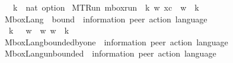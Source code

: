 \begin{isabellebody}
\ \ \ k\ {\isacharcolon}{\kern0pt}{\isacharcolon}{\kern0pt}\ {\isachardoublequoteopen}nat\ option{\isachardoublequoteclose}\ \isanewline
MTRun{\isacharcolon}{\kern0pt}\ {\isachardoublequoteopen}mbox{\isacharunderscore}{\kern0pt}run\ {\isasymC}\isactrlsub {\isasymI}\isactrlsub {\isasymmm}\ k\ w\ xc\ {\isasymLongrightarrow}\ w\ {\isasymin}\ {\isasymT}\isactrlbsub k\isactrlesub {\isachardoublequoteclose}\isanewline
\isanewline
{}\isamarkupfalse%
\ MboxLang\ {\isacharcolon}{\kern0pt}{\isacharcolon}{\kern0pt}\ {\isachardoublequoteopen}bound\ {\isasymRightarrow}\ {\isacharparenleft}{\kern0pt}{\isacharprime}{\kern0pt}information{\isacharcomma}{\kern0pt}\ {\isacharprime}{\kern0pt}peer{\isacharparenright}{\kern0pt}\ action\ language{\isachardoublequoteclose}\ \ {\isacharparenleft}{\kern0pt}{\isachardoublequoteopen}{\isasymL}\isactrlbsub {\isacharunderscore}{\kern0pt}\isactrlesub {\isachardoublequoteclose}\ {\isacharbrackleft}{\kern0pt}{}{}{}{\isacharbrackright}{\kern0pt}\ {}{}{}{\isacharparenright}{\kern0pt}\isanewline
\ \ \isanewline
\ \ {\isachardoublequoteopen}{\isasymL}\isactrlbsub k\isactrlesub \ {\isasymequiv}\ {\isacharbraceleft}{\kern0pt}\ w{\isasymdown}\isactrlsub {\isacharbang}{\kern0pt}\ {\isacharbar}{\kern0pt}\ w{\isachardot}{\kern0pt}\ w\ {\isasymin}\ {\isasymT}\isactrlbsub k\isactrlesub \ {\isacharbraceright}{\kern0pt}{\isachardoublequoteclose}\isanewline
\isanewline
{}\isamarkupfalse%
\ MboxLang{\isacharunderscore}{\kern0pt}bounded{\isacharunderscore}{\kern0pt}by{\isacharunderscore}{\kern0pt}one\ {\isacharcolon}{\kern0pt}{\isacharcolon}{\kern0pt}\ {\isachardoublequoteopen}{\isacharparenleft}{\kern0pt}{\isacharprime}{\kern0pt}information{\isacharcomma}{\kern0pt}\ {\isacharprime}{\kern0pt}peer{\isacharparenright}{\kern0pt}\ action\ language{\isachardoublequoteclose}\ \ {\isacharparenleft}{\kern0pt}{\isachardoublequoteopen}{\isasymL}\isactrlsub {\isasymone}{\isachardoublequoteclose}\ {}{}{}{\isacharparenright}{\kern0pt}\ \isanewline
\ \ {\isachardoublequoteopen}{\isasymL}\isactrlsub {\isasymone}\ {\isasymequiv}\ {\isasymL}\isactrlbsub {\isasymB}\ {}\isactrlesub {\isachardoublequoteclose}\isanewline
\isanewline
{}\isamarkupfalse%
\ MboxLang{\isacharunderscore}{\kern0pt}unbounded\ {\isacharcolon}{\kern0pt}{\isacharcolon}{\kern0pt}\ {\isachardoublequoteopen}{\isacharparenleft}{\kern0pt}{\isacharprime}{\kern0pt}information{\isacharcomma}{\kern0pt}\ {\isacharprime}{\kern0pt}peer{\isacharparenright}{\kern0pt}\ action\ language{\isachardoublequoteclose}\ \ {\isacharparenleft}{\kern0pt}{\isachardoublequoteopen}{\isasymL}\isactrlsub {\isasyminfinity}{\isachardoublequoteclose}\ {}{}{}{\isacharparenright}{\kern0pt}\ \isanewline

\end{isabellebody}
